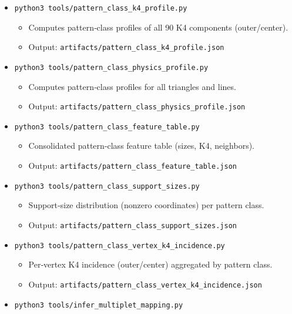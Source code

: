 \documentclass[11pt]{article}
\providecommand{\tightlist}{%
  \setlength{\itemsep}{0pt}\setlength{\parskip}{0pt}}
\begin{document}
\begin{itemize}
  \begin{itemize}
  \tightlist
  \item
    Computes neighbor‑class and triangle‑type profiles per pattern
    class.
  \item
    Output: \texttt{artifacts/pattern\_class\_h12\_h27\_profile.json}
  \end{itemize}
\item
  \texttt{python3\ tools/pattern\_class\_k4\_profile.py}

  \begin{itemize}
  \tightlist
  \item
    Computes pattern‑class profiles of all 90 K4 components
    (outer/center).
  \item
    Output: \texttt{artifacts/pattern\_class\_k4\_profile.json}
  \end{itemize}
\item
  \texttt{python3\ tools/pattern\_class\_physics\_profile.py}

  \begin{itemize}
  \tightlist
  \item
    Computes pattern‑class profiles for all triangles and lines.
  \item
    Output: \texttt{artifacts/pattern\_class\_physics\_profile.json}
  \end{itemize}
\item
  \texttt{python3\ tools/pattern\_class\_feature\_table.py}

  \begin{itemize}
  \tightlist
  \item
    Consolidated pattern‑class feature table (sizes, K4, neighbors).
  \item
    Output: \texttt{artifacts/pattern\_class\_feature\_table.json}
  \end{itemize}
\item
  \texttt{python3\ tools/pattern\_class\_support\_sizes.py}

  \begin{itemize}
  \tightlist
  \item
    Support‑size distribution (nonzero coordinates) per pattern class.
  \item
    Output: \texttt{artifacts/pattern\_class\_support\_sizes.json}
  \end{itemize}
\item
  \texttt{python3\ tools/pattern\_class\_vertex\_k4\_incidence.py}

  \begin{itemize}
  \tightlist
  \item
    Per‑vertex K4 incidence (outer/center) aggregated by pattern class.
  \item
    Output:
    \texttt{artifacts/pattern\_class\_vertex\_k4\_incidence.json}
  \end{itemize}
\item
  \texttt{python3\ tools/infer\_multiplet\_mapping.py}


\end{itemize}
\end{document}
